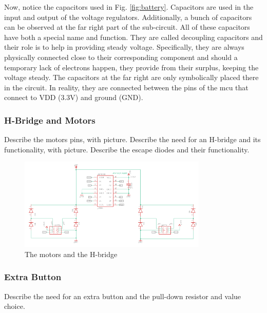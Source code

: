 Now, notice the capacitors used in Fig. \ref{fig:battery}. Capacitors are used in the input and output of the voltage regulators. Additionally, a bunch of capacitors can be observed at the far right part of the sub-circuit.
All of these capacitors have both a special name and function. They are called decoupling capacitors and their role is to help in providing steady voltage. Specifically, they are always physically connected close to their corresponding component and should a temporary lack of electrons happen, they provide from their surplus, keeping the voltage steady.
The capacitors at the far right are only symbolically placed there in the circuit. In reality, they are connected between the pins of the mcu that connect to VDD (3.3V) and ground (GND).



\subsubsection{H-Bridge and Motors}

Describe the motors pins, with picture.
Describe the need for an H-bridge and its functionality, with picture.
Describe the escape diodes and their functionality.

\begin{figure}[htb]
    \centering
    \includegraphics[width=0.8\textwidth]{figures/hardware/MotorsandHBridge.PNG}
    \caption{The motors and the H-bridge}
    \label{fig:motors}
\end{figure}

\FloatBarrier


\subsubsection{Extra Button}

Describe the need for an extra button and the pull-down resistor and value choice.

